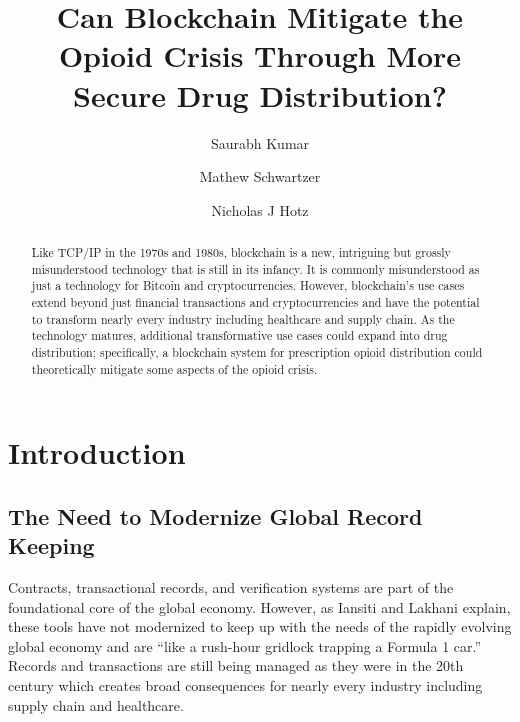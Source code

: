 \documentclass[sigconf]{acmart}
\begin{document}
\title{Can Blockchain Mitigate the Opioid Crisis Through More Secure Drug Distribution?}


\author{Saurabh Kumar}

\author{Mathew Schwartzer}

\author{Nicholas J Hotz}

\begin{abstract}
Like TCP/IP in the 1970s and 1980s, blockchain is a new, intriguing but grossly misunderstood technology that is still in its infancy. It is commonly misunderstood as just a technology for Bitcoin and cryptocurrencies. However, blockchain's use cases extend beyond just financial transactions and cryptocurrencies and have the potential to transform nearly every industry including healthcare and supply chain. As the technology matures, additional transformative use cases could expand into drug distribution; specifically, a blockchain system for prescription opioid distribution could theoretically mitigate some aspects of the opioid crisis.  
\end{abstract}


\maketitle

\section{Introduction}
\subsection{The Need to Modernize Global Record Keeping}
Contracts, transactional records, and verification systems are part of the foundational core of the global economy. However, as Iansiti and Lakhani \cite{hbr} explain, these tools have not modernized to keep up with the needs of the rapidly evolving global economy and are ``like a rush-hour gridlock trapping a Formula 1 car.'' Records and transactions are still being managed as they were in the 20th century which creates broad consequences for nearly every industry including supply chain and healthcare.
\end{document}
